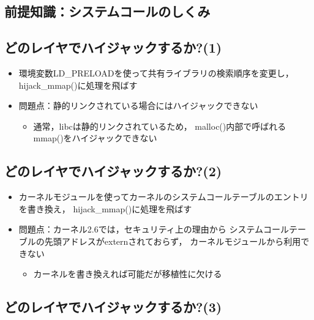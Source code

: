 \documentclass[25pt,papersize,landscape]{jsarticle}
\begin{document}
\subsection{前提知識：システムコールのしくみ}


\subsection{どのレイヤでハイジャックするか?(1)}


\begin{itemize}
\item 環境変数LD\_PRELOADを使って共有ライブラリの検索順序を変更し，
  hijack\_mmap()に処理を飛ばす
\item 問題点：静的リンクされている場合にはハイジャックできない
  \begin{itemize}
  \item 通常，libcは静的リンクされているため，
    malloc()内部で呼ばれるmmap()をハイジャックできない
  \end{itemize}
\end{itemize}

\subsection{どのレイヤでハイジャックするか?(2)}


\begin{itemize}
\item カーネルモジュールを使ってカーネルのシステムコールテーブルのエントリを書き換え，
  hijack\_mmap()に処理を飛ばす
\item 問題点：カーネル2.6では，セキュリティ上の理由から
  システムコールテーブルの先頭アドレスがexternされておらず，
  カーネルモジュールから利用できない
  \begin{itemize}
  \item カーネルを書き換えれば可能だが移植性に欠ける
  \end{itemize}
\end{itemize}

\subsection{どのレイヤでハイジャックするか?(3)}

\end{document}
